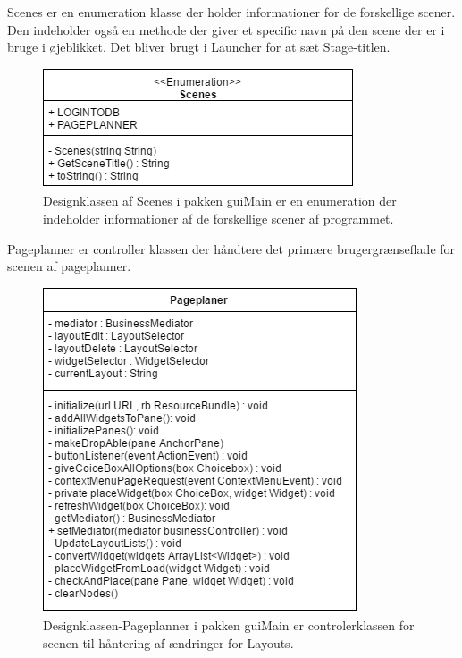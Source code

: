 Scenes er en enumeration klasse der holder informationer for de forskellige scener. Den indeholder også en methode der giver et specific navn på den scene der er i bruge i øjeblikket. Det bliver brugt i Launcher for at sæt Stage-titlen.
      \begin{figure}[H]
      \includegraphics[width=\linewidth]{elaborationsdokumentet/figurer/design/designklasser/Designklasse-Scenes.png}
      \caption{Designklassen af Scenes i pakken guiMain er en enumeration der indeholder informationer af de forskellige scener af programmet.}
      \label{Designklasse-Scenes}
  \end{figure}

Pageplanner er controller klassen der håndtere det primære brugergrænseflade for scenen af pageplanner.
      \begin{figure}[H]
      \includegraphics[width=\linewidth]{elaborationsdokumentet/figurer/design/designklasser/Designklasse-Pageplanner.png}
      \caption{Designklassen-Pageplanner i pakken guiMain er controlerklassen for scenen til håntering af ændringer for Layouts.}
      \label{Designklasse-Pageplanner}
  \end{figure}

